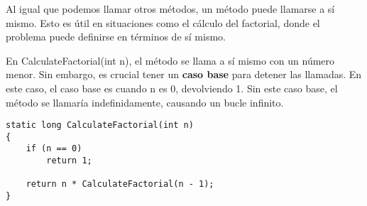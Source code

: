 Al igual que podemos llamar otros métodos, un método puede llamarse a sí mismo. Esto es útil en situaciones como el cálculo del factorial, donde el problema puede definirse en términos de sí mismo.

En CalculateFactorial(int n), el método se llama a sí mismo con un número menor. Sin embargo, es crucial tener un \textbf{caso base} para detener las llamadas. En este caso, el caso base es cuando n es 0, devolviendo 1. Sin este caso base, el método se llamaría indefinidamente, causando un bucle infinito.

\begin{lstlisting}
static long CalculateFactorial(int n)
{
    if (n == 0)
        return 1;
        
    return n * CalculateFactorial(n - 1);
}
\end{lstlisting}
